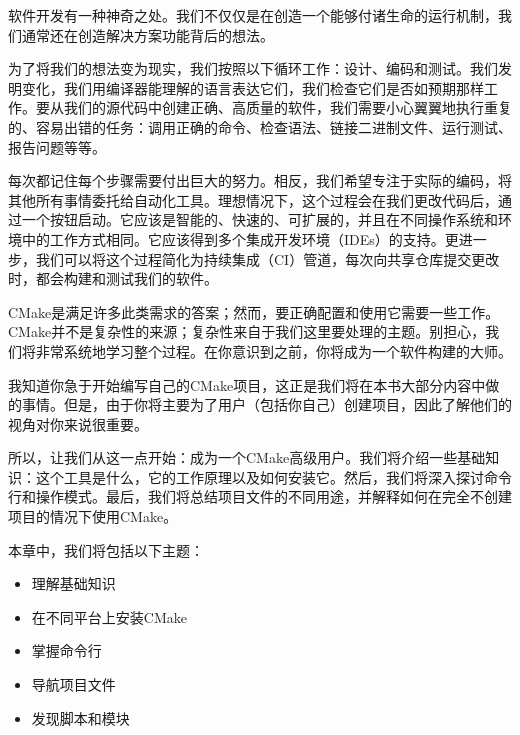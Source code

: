 
软件开发有一种神奇之处。我们不仅仅是在创造一个能够付诸生命的运行机制，我们通常还在创造解决方案功能背后的想法。

为了将我们的想法变为现实，我们按照以下循环工作：设计、编码和测试。我们发明变化，我们用编译器能理解的语言表达它们，我们检查它们是否如预期那样工作。要从我们的源代码中创建正确、高质量的软件，我们需要小心翼翼地执行重复的、容易出错的任务：调用正确的命令、检查语法、链接二进制文件、运行测试、报告问题等等。

每次都记住每个步骤需要付出巨大的努力。相反，我们希望专注于实际的编码，将其他所有事情委托给自动化工具。理想情况下，这个过程会在我们更改代码后，通过一个按钮启动。它应该是智能的、快速的、可扩展的，并且在不同操作系统和环境中的工作方式相同。它应该得到多个集成开发环境（IDEs）的支持。更进一步，我们可以将这个过程简化为持续集成（CI）管道，每次向共享仓库提交更改时，都会构建和测试我们的软件。

CMake是满足许多此类需求的答案；然而，要正确配置和使用它需要一些工作。CMake并不是复杂性的来源；复杂性来自于我们这里要处理的主题。别担心，我们将非常系统地学习整个过程。在你意识到之前，你将成为一个软件构建的大师。

我知道你急于开始编写自己的CMake项目，这正是我们将在本书大部分内容中做的事情。但是，由于你将主要为了用户（包括你自己）创建项目，因此了解他们的视角对你来说很重要。

所以，让我们从这一点开始：成为一个CMake高级用户。我们将介绍一些基础知识：这个工具是什么，它的工作原理以及如何安装它。然后，我们将深入探讨命令行和操作模式。最后，我们将总结项目文件的不同用途，并解释如何在完全不创建项目的情况下使用CMake。

本章中，我们将包括以下主题：

\begin{itemize}
\item
理解基础知识

\item
在不同平台上安装CMake

\item
掌握命令行

\item
导航项目文件

\item
发现脚本和模块
\end{itemize}
























